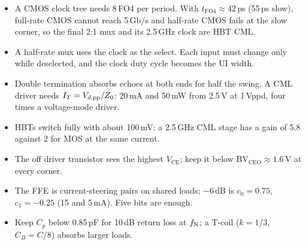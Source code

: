\begin{takeaways}
\begin{itemize}
  \item A CMOS clock tree needs 8\,FO4 per period. With $t_\mathrm{FO4}\approx42$\,ps (55\,ps slow), full-rate CMOS cannot reach 5\,Gb/s and half-rate CMOS fails at the slow corner, so the final 2:1 mux and its 2.5\,GHz clock are HBT CML.
  \item A half-rate mux uses the clock as the select. Each input must change only while deselected, and the clock duty cycle becomes the UI width.
  \item Double termination absorbs echoes at both ends for half the swing. A CML driver needs $I_T=V_{d,\mathrm{pp}}/Z_0$: 20\,mA and 50\,mW from 2.5\,V at 1\,Vppd, four times a voltage-mode driver.
  \item HBTs switch fully with about 100\,mV: a 2.5\,GHz CML stage has a gain of 5.8 against 2 for MOS at the same current.
  \item The off driver transistor sees the highest $V_\mathrm{CE}$; keep it below $\mathrm{BV}_\mathrm{CEO}\approx1.6$\,V at every corner.
  \item The FFE is current-steering pairs on shared loads; $-6$\,dB is $c_0=0.75$, $c_1=-0.25$ (15 and 5\,mA). Five bits are enough.
  \item Keep $C_p$ below 0.85\,pF for 10\,dB return loss at $f_\mathrm{N}$; a T-coil ($k=1/3$, $C_B=C/8$) absorbs larger loads.
\end{itemize}
\end{takeaways}
